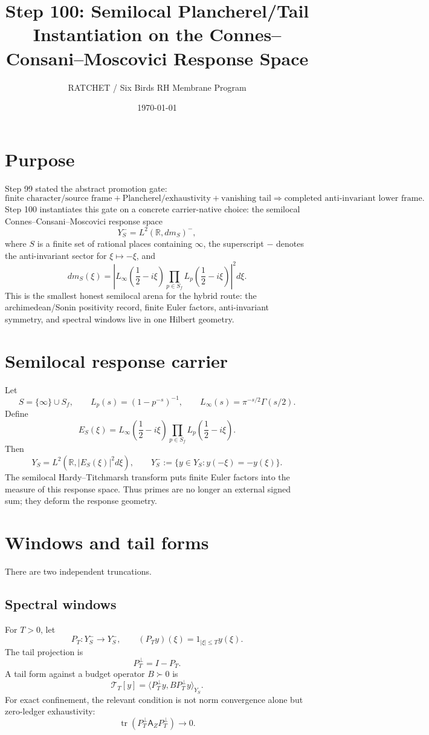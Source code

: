 \documentclass[11pt]{article}
\title{Step 100: Semilocal Plancherel/Tail Instantiation on the Connes--Consani--Moscovici Response Space}
\author{RATCHET / Six Birds RH Membrane Program}
\date{\today}
\newcommand{\R}{\mathbb R}
\newcommand{\ip}[2]{\langle #1,#2\rangle}
\begin{document}
\maketitle

\section{Purpose}
Step 99 stated the abstract promotion gate:
\[
\text{finite character/source frame}
+\text{Plancherel/exhaustivity}
+\text{vanishing tail}
\Longrightarrow
\text{completed anti-invariant lower frame}.
\]
Step 100 instantiates this gate on a concrete carrier-native choice: the semilocal Connes--Consani--Moscovici response space
\[
Y_S^- = L^2(\R,dm_S)^-,
\]
where \(S\) is a finite set of rational places containing \(\infty\), the superscript \(-\) denotes the anti-invariant sector for \(\xi\mapsto-\xi\), and
\[
 dm_S(\xi)=\left|L_\infty\!\left(\frac12-i\xi\right)
 \prod_{p\in S_f} L_p\!\left(\frac12-i\xi\right)\right|^2d\xi.
\]
This is the smallest honest semilocal arena for the hybrid route: the archimedean/Sonin positivity record, finite Euler factors, anti-invariant symmetry, and spectral windows live in one Hilbert geometry.

\section{Semilocal response carrier}
Let
\[
S=\{\infty\}\cup S_f,
\qquad
L_p(s)=(1-p^{-s})^{-1},
\qquad
L_\infty(s)=\pi^{-s/2}\Gamma(s/2).
\]
Define
\[
E_S(\xi)=L_\infty\!\left(\frac12-i\xi\right)
\prod_{p\in S_f}L_p\!\left(\frac12-i\xi\right).
\]
Then
\[
Y_S=L^2(\R,|E_S(\xi)|^2d\xi),
\qquad
Y_S^-:=\{y\in Y_S:y(-\xi)=-y(\xi)\}.
\]
The semilocal Hardy--Titchmarsh transform puts finite Euler factors into the measure of this response space. Thus primes are no longer an external signed sum; they deform the response geometry.

\section{Windows and tail forms}
There are two independent truncations.

\subsection{Spectral windows}
For \(T>0\), let
\[
P_T:Y_S^-\to Y_S^- ,\qquad (P_Ty)(\xi)=1_{|\xi|\le T}y(\xi).
\]
The tail projection is
\[
P_T^\perp=I-P_T.
\]
A tail form against a budget operator \(B\succ0\) is
\[
\mathcal T_T[y]=\ip{P_T^\perp y}{B P_T^\perp y}_{Y_S}.
\]
For exact confinement, the relevant condition is not norm convergence alone but zero-ledger exhaustivity:
\[
\operatorname{tr}(P_T^\perp\mathsf A_ZP_T^\perp)\to0.
\]
\end{document}
